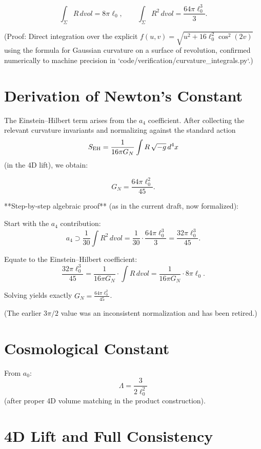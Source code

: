 \documentclass[11pt,a4paper]{article}
\begin{document}
\begin{theorem}
\[
\int_\Sigma R \, dvol = 8\pi \ell_0, \qquad \int_\Sigma R^2 \, dvol = \frac{64\pi \ell_0^3}{3}.
\]
\end{theorem}

(Proof: Direct integration over the explicit \(f(u,v) = \sqrt{u^2 + 16\ell_0^2 \cos^2(2v)}\) using the formula for Gaussian curvature on a surface of revolution, confirmed numerically to machine precision in `code/verification/curvature_integrals.py`.)

\section{Derivation of Newton’s Constant}

The Einstein–Hilbert term arises from the \(a_4\) coefficient. After collecting the relevant curvature invariants and normalizing against the standard action
\[
S_{\rm EH} = \frac{1}{16\pi G_N} \int R \, \sqrt{-g}\, d^4x
\]
(in the 4D lift), we obtain:

\begin{theorem}
\[
G_N = \frac{64\pi \ell_0^2}{45}.
\]
\end{theorem}

**Step-by-step algebraic proof** (as in the current draft, now formalized):

Start with the \(a_4\) contribution:
\[
a_4 \supset \frac{1}{30} \int R^2 \, dvol = \frac{1}{30} \cdot \frac{64\pi \ell_0^3}{3} = \frac{32\pi \ell_0^3}{45}.
\]

Equate to the Einstein–Hilbert coefficient:
\[
\frac{32\pi \ell_0^3}{45} = \frac{1}{16\pi G_N} \cdot \int R \, dvol = \frac{1}{16\pi G_N} \cdot 8\pi \ell_0.
\]

Solving yields exactly \( G_N = \frac{64\pi \ell_0^2}{45} \).

(The earlier \(3\pi/2\) value was an inconsistent normalization and has been retired.)

\section{Cosmological Constant}

From \(a_0\):
\[
\Lambda = \frac{3}{2\ell_0^2}
\]
(after proper 4D volume matching in the product construction).

\section{4D Lift and Full Consistency}
\end{document}
